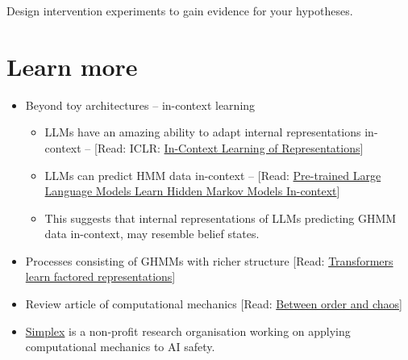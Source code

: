 \documentclass[11pt]{article}
\begin{document}
\begin{exercise}
\label{ex:actuators-2}
Design intervention experiments to gain evidence for your hypotheses.
\end{exercise}


\section{Learn more}\label{learn-more}

\begin{itemize}
\item
  Beyond toy architectures -- in-context learning
  \begin{itemize}
  \item
    LLMs have an amazing ability to adapt internal representations in-context -- {[}Read: ICLR: \href{https://arxiv.org/pdf/2501.00070}{In-Context Learning of Representations}{]}
  \item
    LLMs can predict HMM data in-context -- {[}Read: \href{https://arxiv.org/pdf/2506.07298}{Pre-trained Large Language Models Learn Hidden Markov Models In-context}{]}
  \item
    This suggests that internal representations of LLMs predicting GHMM data in-context, may resemble belief states.
  \end{itemize}
\item
  Processes consisting of GHMMs with richer structure {[}Read: \href{https://arxiv.org/pdf/2602.02385v1}{Transformers learn factored representations}{]}
\item
  Review article of computational mechanics {[}Read: \href{https://www.nature.com/articles/nphys2190}{Between order and chaos}{]}
\item
  \href{https://www.simplexaisafety.com/}{Simplex} is a non-profit research organisation working on applying computational mechanics to AI safety.
\end{itemize}
\end{document}
